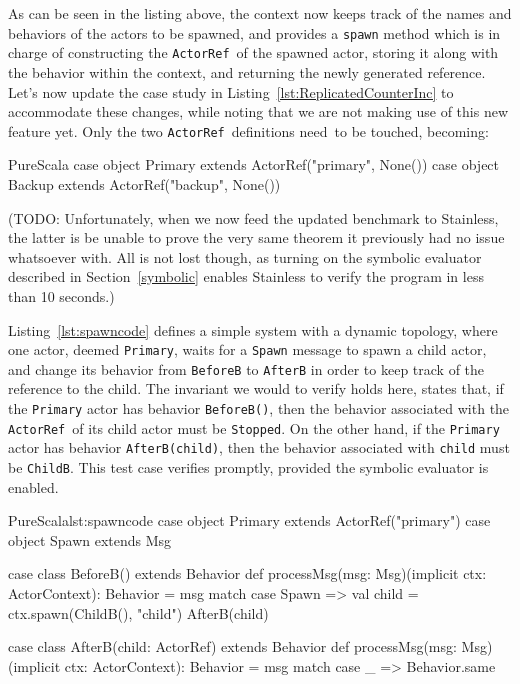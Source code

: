 \documentclass[a4paper,twoside]{article}
\newcommand{\InlineS}[1]{\lstinline[language=PureScala,basicstyle=\small\ttfamily,columns=fixed]|#1|}
\newcommand{\TODO}[1]{\textcolor{YellowOrange}{(TODO: #1)}} %
\newcommand{\RefSec}[1]{Section~\ref{#1}}
\newcommand{\RefCode}[1]{Listing~\ref{#1}}
\newcommand{\ActorRef}{\InlineS{ActorRef}\ }
\newcommand{\stt}[1]{\texttt{\small{#1}}}
\begin{document}
\begin{enumerate}
As can be seen in the listing above, the context now keeps track of the names and 
behaviors of the actors to be spawned, and provides a \stt{spawn} method which is in  charge of constructing the \ActorRef of the spawned actor, storing it along with the  behavior within the context, and returning the newly generated reference.\\

Let's now update the case study in \RefCode{lst:ReplicatedCounterInc} to accommodate 
these changes, while noting that we are not making use of this new feature yet. Only 
the two \ActorRef definitions need to be touched, becoming:

\begin{ShortCode}{PureScala}
case object Primary extends ActorRef("primary", None())
case object Backup  extends ActorRef("backup", None())
\end{ShortCode}

\TODO{Unfortunately, when we now feed the updated benchmark to Stainless, the latter is be  unable to prove the very same theorem it previously had no issue whatsoever with.
All is not lost though, as turning on the symbolic evaluator described in
\RefSec{symbolic} enables Stainless to verify the program in less than 10 seconds.}

\RefCode{lst:spawncode} defines a simple system with a dynamic topology, where one actor, deemed \stt{Primary}, waits for a \stt{Spawn} message to spawn a child actor, and change its behavior from \stt{BeforeB} to \stt{AfterB} in order to keep track of the reference to the child. The invariant we would to verify holds here, states that, if the \stt{Primary} actor has behavior \stt{BeforeB()}, then the behavior associated with the \ActorRef of its child actor must be \stt{Stopped}. On the other hand, if the \stt{Primary} actor has behavior \stt{AfterB(child)}, then the behavior associated with \stt{child} must be \stt{ChildB}. This test case verifies promptly, provided the symbolic evaluator is enabled.

\begin{Code}{PureScala}{lst:spawncode}{}
case object Primary extends ActorRef("primary")
case object Spawn extends Msg

case class BeforeB() extends Behavior {
  def processMsg(msg: Msg)(implicit ctx: ActorContext): Behavior = msg match {
    case Spawn =>
      val child = ctx.spawn(ChildB(), "child")
      AfterB(child)
  }
}

case class AfterB(child: ActorRef) extends Behavior {
  def processMsg(msg: Msg)(implicit ctx: ActorContext): Behavior = msg match {
    case _ => Behavior.same
  }
}


\end{Code}
\end{enumerate}
\end{document}
